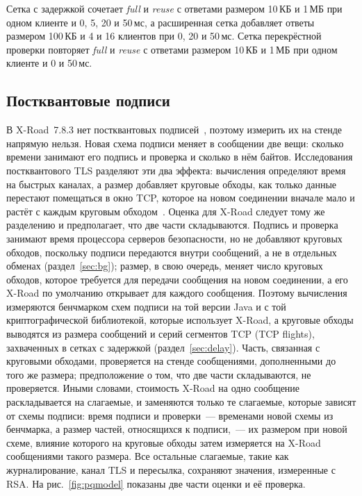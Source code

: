 \documentclass[conference,a4paper]{IEEEtran}
\newcommand{\newtext}[1]{{\color{blue}#1}}
\newcommand{\newviolet}[1]{{\color{violet}#1}}
\begin{document}
Сетка с задержкой сочетает \emph{full} и \emph{reuse} с ответами размером 10\,КБ и 1\,МБ при одном клиенте
и 0, 5, 20 и 50\,мс, а расширенная сетка добавляет ответы размером 100\,КБ и 4 и 16 клиентов при 0, 20
и 50\,мс. Сетка перекрёстной проверки повторяет \emph{full} и \emph{reuse} с ответами размером 10\,КБ и 1\,МБ
при одном клиенте и 0 и 50\,мс.

\subsection{\newtext{Постквантовые подписи}}\label{sec:pqmethod}

{\color{blue}В X-Road~7.8.3 нет постквантовых подписей~\cite{bakhtina2026pqc,snetkov2023}, поэтому
измерить их на стенде напрямую нельзя. Новая схема подписи меняет в сообщении
две вещи: сколько времени занимают его подпись и проверка и сколько в нём байтов. Исследования
постквантового TLS разделяют эти два эффекта: вычисления определяют время на быстрых каналах, а
размер добавляет круговые обходы, как только данные перестают помещаться в окно TCP, которое на новом
соединении вначале мало и растёт с каждым круговым обходом~\cite{paquin2020,sikeridis2020}. Оценка для X-Road
следует тому же разделению и предполагает, что две части складываются. Подпись и проверка занимают
время процессора серверов безопасности, но не добавляют круговых обходов, поскольку подписи передаются
внутри сообщений, а не в отдельных обменах (раздел~\ref{sec:bg}); размер, в свою очередь,
меняет число круговых обходов, которое требуется для передачи сообщения на новом соединении, а его X-Road по умолчанию открывает
для каждого сообщения. Поэтому вычисления измеряются бенчмарком
схем подписи на той версии Java и с той криптографической библиотекой, которые использует X-Road, а
круговые обходы выводятся из размера сообщений и серий сегментов TCP (TCP flights), захваченных в сетках с
задержкой (раздел~\ref{sec:delay}). Часть, связанная с круговыми обходами, проверяется на стенде сообщениями, дополненными
до того же размера; предположение о том, что две части складываются, не проверяется. \newtext{Иными словами,
стоимость X-Road на одно сообщение раскладывается на слагаемые, и заменяются только те слагаемые, которые зависят от схемы
подписи: время подписи и проверки~--- временами новой схемы из бенчмарка,
а размер частей, относящихся к подписи,~--- их размером при новой схеме, влияние которого на круговые
обходы затем измеряется на X-Road сообщениями такого размера. Все остальные слагаемые, такие как журналирование,
канал TLS и пересылка, сохраняют значения, измеренные с RSA.} \newviolet{На рис.~\ref{fig:pqmodel}
показаны две части оценки и её проверка.}

}
\end{document}
